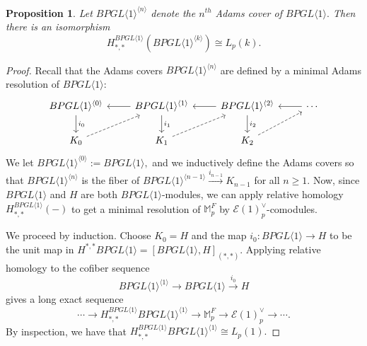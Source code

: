 \documentclass{amsart}
\newtheorem{proposition}[theorem]{Proposition}
\theoremstyle{plain}
\numberwithin{theorem}{section}
\numberwithin{equation}{section}
\numberwithin{figure}{section}
\newcommand{\0}{\langle 0 \rangle }
\begin{document}
\begin{proposition}
\label{prop:RelativeHomologyBPGL1AdamsCoverLightning}
Let $BPGL\langle 1 \rangle ^{\langle n \rangle}$ denote the $n^{th}$ Adams cover of $BPGL \langle 1 \rangle.$ Then there is an isomorphism
\[H^{BPGL \langle 1 \rangle}_{*,*}(BPGL\langle 1 \rangle^{\langle k\rangle}) \cong L_p(k).\]
\end{proposition}

\begin{proof}
    Recall that the Adams covers $BPGL \langle 1 \rangle^{\langle n \rangle}$ are defined by a minimal Adams resolution of $BPGL \langle 1 \rangle$:
    \[\begin{tikzcd}
	{BPGL \langle 1 \rangle^{\langle 0 \rangle}} & {BPGL \langle 1 \rangle^{\langle 1 \rangle}} & {BPGL \langle 1 \rangle^{\langle 2 \rangle}} & \cdots \\
	{K_0} & {K_1} & {K_2}
	\arrow["{i_0}", from=1-1, to=2-1]
	\arrow[from=1-2, to=1-1]
	\arrow["{i_1}", from=1-2, to=2-2]
	\arrow[from=1-3, to=1-2]
	\arrow["{i_2}", from=1-3, to=2-3]
	\arrow[from=1-4, to=1-3]
	\arrow[dashed, from=2-1, to=1-2]
	\arrow[dashed, from=2-2, to=1-3]
	\arrow[dashed, from=2-3, to=1-4]
    \end{tikzcd}\]   
    We let $BPGL \langle 1 \rangle ^{\langle 0 \rangle} := BPGL \langle 1 \rangle,$ and we inductively define the Adams covers so that $BPGL \langle 1 \rangle^{\langle n \rangle}$ is the fiber of $BPGL \langle 1 \rangle^{\langle n-1 \rangle} \xrightarrow{i_{n-1}}K_{n-1}$ for all $n \geq 1.$ Now, since $BPGL \langle 1 \rangle$ and $H$ are both $BPGL \langle 1 \rangle$-modules, we can apply relative homology $H_{*,*}^{BPGL \langle 1 \rangle}(-)$ to get a minimal resolution of $\mathbb{M}_p^F$ by $\mathcal{E}(1)^\vee_p$-comodules.

    We proceed by induction. Choose $K_0=H$ and the map $i_0:BPGL \langle 1 \rangle \to H$ to be the unit map in $H^{*,*}BPGL \langle 1 \rangle = [BPGL\langle 1\rangle, H]_{(*,*)}.$ Applying relative homology to the cofiber sequence
    \[BPGL \langle 1 \rangle^{\langle 1 \rangle} \to BPGL \langle 1 \rangle \xrightarrow{i_0}H\]
    gives a long exact sequence
    \[\cdots \to H_{*,*}^{BPGL \langle 1 \rangle}BPGL \langle 1 \rangle^{\langle 1 \rangle} \to \mathbb{M}_p^F \to \mathcal{E}(1)^\vee_p \to \cdots.\]
    By inspection, we have that $H_{*,*}^{BPGL \langle 1 \rangle}BPGL \langle 1 \rangle^{\langle 1 \rangle} \cong L_p(1).$


\end{proof}
\end{document}
